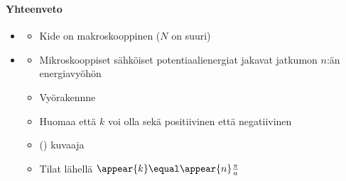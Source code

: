 \begin{frame}
\frametitle{\texorpdfstring{\culine[\sectiontitleulinecolor]{\sectiontitle}}{\sectiontitle} }
\framesubtitle{Yhteenveto}
\appear{}

\begin{itemize}
	\item[] \begin{itemize}[itemsep=1.5mm,leftmargin=0mm] \small
	 \item Kide on makroskooppinen ($N$ on suuri) 
	 \end{itemize}
\end{itemize}
	 	
\vspace{1.8mm}
\begin{minipage}{8.2cm} %
\begin{itemize}
	\item[] \begin{itemize}[itemsep=1.5mm,leftmargin=0mm] \small
	 
	 \item Mikroskooppiset sähköiset potentiaalienergiat  jakavat jatkumon $n$:än energiavyöhön
	
	\item Vyörakennne      
	
	\item Huomaa että $k$ voi olla sekä positiivinen että nega\-tii\-vinen
	
	\item () kuvaaja 
	\vspace{-1mm}
	\item Tilat lähellä $\appear{k} \equal \appear{n} \frac{\pi}{a}$ 


\end{itemize}
\end{itemize}
\end{minipage}
\end{frame}
